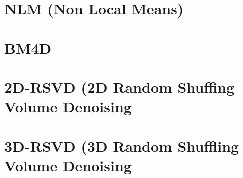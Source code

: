 \documentclass{article}
\begin{document}
\section{NLM (Non Local Means)} 

\section{BM4D}

\section{2D-RSVD (2D Random Shuffing Volume Denoising}

\section{3D-RSVD (3D Random Shuffling Volume Denoising}


\section{}



\end{document}
